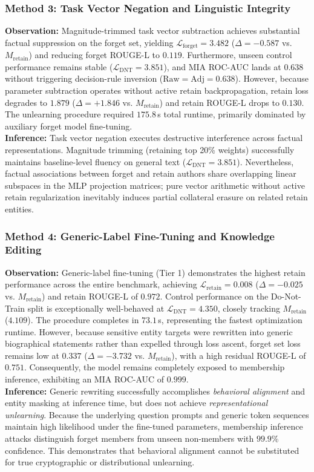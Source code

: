 \documentclass[11pt,a4paper]{article}
\begin{document}
\subsubsection{Method 3: Task Vector Negation and Linguistic Integrity}
\textbf{Observation:} Magnitude-trimmed task vector subtraction achieves substantial factual suppression on the forget set, yielding $\mathcal{L}_{\text{forget}} = 3.482$ ($\Delta = -0.587$ vs. $M_{\text{retain}}$) and reducing forget ROUGE-L to $0.119$. Furthermore, unseen control performance remains stable ($\mathcal{L}_{\text{DNT}} = 3.851$), and MIA ROC-AUC lands at $0.638$ without triggering decision-rule inversion ($\text{Raw} = \text{Adj} = 0.638$). However, because parameter subtraction operates without active retain backpropagation, retain loss degrades to $1.879$ ($\Delta = +1.846$ vs. $M_{\text{retain}}$) and retain ROUGE-L drops to $0.130$. The unlearning procedure required $175.8$\,s total runtime, primarily dominated by auxiliary forget model fine-tuning. \\
\textbf{Inference:} Task vector negation executes destructive interference across factual representations. Magnitude trimming (retaining top 20\% weights) successfully maintains baseline-level fluency on general text ($\mathcal{L}_{\text{DNT}} = 3.851$). Nevertheless, factual associations between forget and retain authors share overlapping linear subspaces in the MLP projection matrices; pure vector arithmetic without active retain regularization inevitably induces partial collateral erasure on related retain entities.

\subsubsection{Method 4: Generic-Label Fine-Tuning and Knowledge Editing}
\textbf{Observation:} Generic-label fine-tuning (Tier 1) demonstrates the highest retain performance across the entire benchmark, achieving $\mathcal{L}_{\text{retain}} = 0.008$ ($\Delta = -0.025$ vs. $M_{\text{retain}}$) and retain ROUGE-L of $0.972$. Control performance on the Do-Not-Train split is exceptionally well-behaved at $\mathcal{L}_{\text{DNT}} = 4.350$, closely tracking $M_{\text{retain}}$ ($4.109$). The procedure completes in $73.1$\,s, representing the fastest optimization runtime. However, because sensitive entity targets were rewritten into generic biographical statements rather than expelled through loss ascent, forget set loss remains low at $0.337$ ($\Delta = -3.732$ vs. $M_{\text{retain}}$), with a high residual ROUGE-L of $0.751$. Consequently, the model remains completely exposed to membership inference, exhibiting an MIA ROC-AUC of $0.999$. \\
\textbf{Inference:} Generic rewriting successfully accomplishes \textit{behavioral alignment} and entity masking at inference time, but does not achieve \textit{representational unlearning}. Because the underlying question prompts and generic token sequences maintain high likelihood under the fine-tuned parameters, membership inference attacks distinguish forget members from unseen non-members with $99.9\%$ confidence. This demonstrates that behavioral alignment cannot be substituted for true cryptographic or distributional unlearning.
\end{document}
